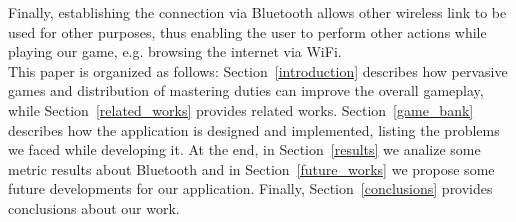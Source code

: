 Finally, establishing the connection via Bluetooth
allows other wireless link to be used for other purposes, thus enabling the
user to perform other actions while playing our game, e.g. browsing the
internet via WiFi.\\

This paper is organized as follows: Section~\ref{introduction} describes how 
pervasive games and distribution of mastering duties can improve the overall 
gameplay, while Section~\ref{related_works} provides related works. 
Section~\ref{game_bank} describes how the application is designed and 
implemented, listing the problems we faced while developing it. At the end, in 
Section~\ref{results} we analize some metric results about Bluetooth and in 
Section~\ref{future_works} we propose some future developments for our 
application. Finally, Section~\ref{conclusions} provides conclusions about our 
work.
